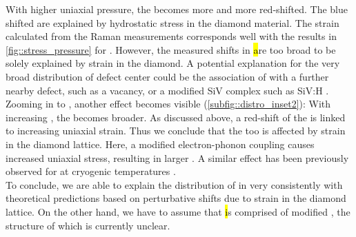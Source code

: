 	With higher uniaxial pressure, the \ZPL becomes more and more red-shifted.
	The blue shifted \ZPL \cwls are explained by hydrostatic stress in the diamond material.
	The strain calculated from the Raman measurements corresponds well with the results in \autoref{fig::stress_pressure} for \vl.
	However, the measured shifts in \hl are too broad to be solely explained by strain in the diamond.
	A potential explanation for the very broad distribution of defect center \ZPL \cwls could be the association of \sivs with a further nearby defect, such as a vacancy, or a modified SiV complex such as SiV:H \cite{Thiering2015}.
	\\
	Zooming in to \vl, another effect becomes visible (\autoref{subfig::distro_inset2}):
	With increasing  \ZPL \cwl, the \lw becomes broader.
	As discussed above, a red-shift of the \ZPL is linked to increasing uniaxial strain.
	Thus we conclude that the \ZPL \lw too is affected by strain in the diamond lattice.
	Here, a modified electron-phonon coupling \cite{Jahnke2015a} causes increased uniaxial stress, resulting in larger \lws.
	A similar effect has been previously observed for \sivs at cryogenic temperatures \cite{Arend2016a}.
	\\
	To conclude, we are able to explain the distribution of \ZPL \cwls in \vl very consistently with theoretical predictions based on perturbative shifts due to strain in the diamond lattice.
	On the other hand, we have to assume that \hl is comprised of modified \sivs, the structure of which is currently unclear.
